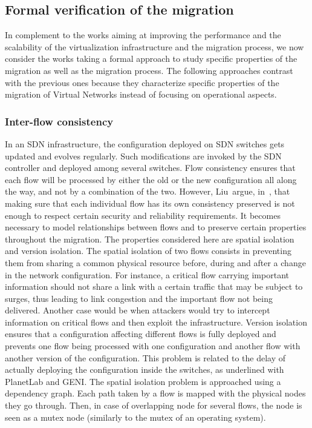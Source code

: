 \subsection{Formal verification of the migration}
In complement to the works aiming at improving the performance and the scalability of the virtualization infrastructure and the migration process, we now consider the works taking a formal approach to study specific properties of the migration as well as the migration process. 
The following approaches contrast with the previous ones because they characterize specific properties of the migration of Virtual Networks instead of focusing on operational aspects. 

\subsubsection{Inter-flow consistency}
In an SDN infrastructure, the configuration deployed on SDN switches gets updated and evolves regularly. Such modifications are invoked by the SDN controller and deployed among several switches.
Flow consistency ensures that each flow will be processed by either the old or the new configuration all along the way, and not by a combination of the two.
However, Liu~\etal argue, in~\cite{Liu2015a}, that making sure that each individual flow has its own consistency preserved is not enough to respect certain security and reliability requirements.
It becomes necessary to model relationships between flows and to preserve certain properties throughout the migration.
The properties considered here are spatial isolation and version isolation.
The spatial isolation of two flows consists in preventing them from sharing a common physical resource before, during and after a change in the network configuration.
For instance, a critical flow carrying important information should not share a link with a certain traffic that may be subject to surges, thus leading to link congestion and the important flow not being delivered. Another case would be when attackers would try to intercept information on critical flows and then exploit the infrastructure.
Version isolation ensures that a configuration affecting different flows is fully deployed and prevents one flow being processed with one configuration and another flow with another version of the configuration.
This problem is related to the delay of actually deploying the configuration inside the switches, as underlined with PlanetLab and GENI.
The spatial isolation problem is approached using a dependency graph. Each path taken by a flow is mapped with the physical nodes they go through. Then, in case of overlapping node for several flows, the node is seen as a mutex node (similarly to the mutex of an operating system).
